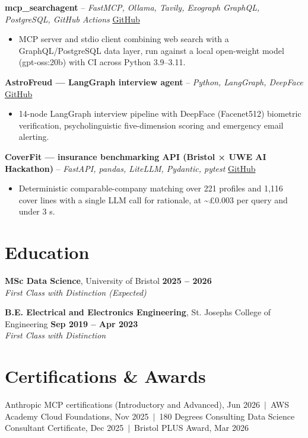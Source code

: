 \documentclass[a4paper,11pt]{article}
\begin{document}
\vspace{3pt}
\noindent\textbf{mcp\_searchagent} -- \textit{FastMCP, Ollama, Tavily, Exograph GraphQL, PostgreSQL, GitHub Actions} \hfill \href{https://github.com/Thiruvel-AP/mcp_searchagent}{GitHub}
\begin{itemize}
  \item MCP server and stdio client combining web search with a GraphQL/PostgreSQL data layer, run against a local open-weight model (gpt-oss:20b) with CI across Python 3.9–3.11.
\end{itemize}
\vspace{3pt}
\noindent\textbf{AstroFreud — LangGraph interview agent} -- \textit{Python, LangGraph, DeepFace} \hfill \href{https://github.com/Thiruvel-AP/AstroFreud}{GitHub}
\begin{itemize}
  \item 14-node LangGraph interview pipeline with DeepFace (Facenet512) biometric verification, psycholinguistic five-dimension scoring and emergency email alerting.
\end{itemize}
\vspace{3pt}
\noindent\textbf{CoverFit — insurance benchmarking API (Bristol × UWE AI Hackathon)} -- \textit{FastAPI, pandas, LiteLLM, Pydantic, pytest} \hfill \href{https://github.com/Thiruvel-AP/AIHackathon-Phoenix}{GitHub}
\begin{itemize}
  \item Deterministic comparable-company matching over 221 profiles and 1,116 cover lines with a single LLM call for rationale, at \textasciitilde{}£0.003 per query and under 3 s.
\end{itemize}

\section{Education}
\textbf{MSc Data Science}, University of Bristol \hfill \textbf{2025 – 2026}\\ \textit{First Class with Distinction (Expected)}\par
\vspace{3pt}
\textbf{B.E. Electrical and Electronics Engineering}, St. Joseph\textquotesingle{}s College of Engineering \hfill \textbf{Sep 2019 – Apr 2023}\\ \textit{First Class with Distinction}\par

\section{Certifications \& Awards}
Anthropic MCP certifications (Introductory and Advanced), Jun 2026 \,$|$\, AWS Academy Cloud Foundations, Nov 2025 \,$|$\, 180 Degrees Consulting Data Science Consultant Certificate, Dec 2025 \,$|$\, Bristol PLUS Award, Mar 2026
\end{document}
